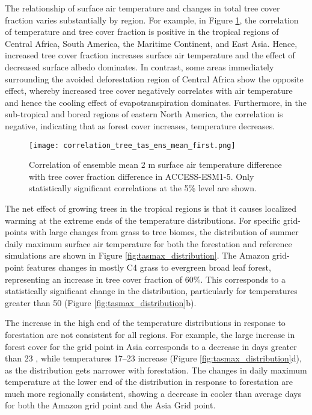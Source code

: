 \documentclass[draft]{agujournal2019}
\begin{document}
The relationship of surface air temperature and changes in total tree cover fraction varies substantially by region.
For example, in Figure \ref{fig:map_tas_tree_correlation}, the correlation of temperature and tree cover fraction is positive in the tropical regions of Central Africa, South America, the Maritime Continent, and East Asia.
Hence, increased tree cover fraction increases surface air temperature and the effect of decreased surface albedo dominates.
In contrast, some areas immediately surrounding the avoided deforestation region of Central Africa show the opposite effect, whereby increased tree cover negatively correlates with air temperature and hence the cooling effect of evapotranspiration dominates.
Furthermore, in the sub-tropical and boreal regions of eastern North America, the correlation is negative, indicating that as forest cover increases, temperature decreases.

\begin{figure}
    \texttt{[image: correlation\_tree\_tas\_ens\_mean\_first.png]}
    \caption{Correlation of ensemble mean 2 m surface air temperature difference  with  tree cover fraction difference  in ACCESS-ESM1-5. Only statistically significant correlations at the 5\% level are shown.}
    \label{fig:map_tas_tree_correlation}
\end{figure}

The net effect of growing trees in the tropical regions is that it causes localized warming at the extreme ends of the temperature distributions.
For specific grid-points with large changes from grass to tree biomes, the distribution of summer daily maximum surface air temperature for both the forestation and reference simulations are shown in Figure \ref{fig:tasmax_distribution}.
The Amazon grid-point features changes in mostly C4 grass to evergreen broad leaf forest, representing an increase in tree cover fraction of 60\%.
This corresponds to a statistically significant change in the distribution, particularly for temperatures greater than 50 \textcelsius{} (Figure \ref{fig:tasmax_distribution}b).

The increase in the high end of the temperature distributions in response to forestation are not consistent for all regions.
For example, the large increase in forest cover for the grid point in Asia corresponds to a decrease in days greater than 23 \textcelsius{}, while temperatures 17--23 \textcelsius{} increase (Figure \ref{fig:tasmax_distribution}d), as the distribution gets narrower with forestation.
The changes in daily maximum temperature at the lower end of the distribution in response to forestation are much more regionally consistent, showing a decrease in cooler than average days for both the Amazon grid point and the Asia Grid point.
\end{document}

